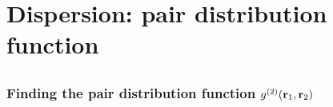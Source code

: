 
\section{Dispersion: pair distribution function}

\subsection{}

\begin{frame}
  \frametitle{Finding the pair distribution function $g^{(2)}(\mathbf{r}_1,\mathbf{r}_2)$}
  \begin{figure}[h]
    \centering
  \end{figure}
\end{frame}

